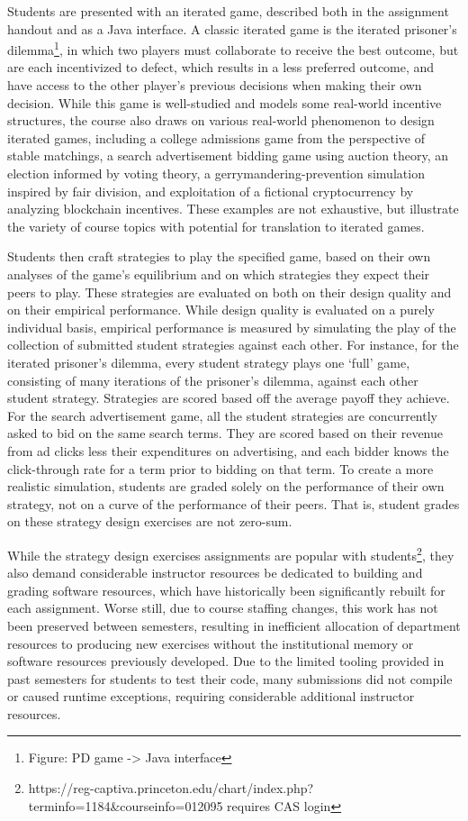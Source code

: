 \documentclass[pageno]{jpaper}
\begin{document}
Students are presented with an iterated game, described both in the assignment handout and as a Java interface.
A classic iterated game is the iterated prisoner's dilemma\footnote{Figure: PD game -> Java interface}, in which two players must collaborate to receive the best outcome, but are each incentivized to defect, which results in a less preferred outcome, and have access to the other player's previous decisions when making their own decision.
While this game is well-studied and models some real-world incentive structures, the course also draws on various real-world phenomenon to design iterated games, including a college admissions game from the perspective of stable matchings, a search advertisement bidding game using auction theory, an election informed by voting theory, a gerrymandering-prevention simulation inspired by fair division, and exploitation of a fictional cryptocurrency by analyzing blockchain incentives.
These examples are not exhaustive, but illustrate the variety of course topics with potential for translation to iterated games.

Students then craft strategies to play the specified game, based on their own analyses of the game's equilibrium and on which strategies they expect their peers to play.
These strategies are evaluated on both on their design quality and on their empirical performance.
While design quality is evaluated on a purely individual basis, empirical performance is measured by simulating the play of the collection of submitted student strategies against each other.
For instance, for the iterated prisoner's dilemma, every student strategy plays one `full' game, consisting of many iterations of the prisoner's dilemma, against each other student strategy.
Strategies are scored based off the average payoff they achieve.
For the search advertisement game, all the student strategies are concurrently asked to bid on the same search terms.
They are scored based on their revenue from ad clicks less their expenditures on advertising, and each bidder knows the click-through rate for a term prior to bidding on that term.
To create a more realistic simulation, students are graded solely on the performance of their own strategy, not on a curve of the performance of their peers.
That is, student grades on these strategy design exercises are not zero-sum.

While the strategy design exercises assignments are popular with students\footnote{https://reg-captiva.princeton.edu/chart/index.php?terminfo=1184\&courseinfo=012095 requires CAS login}, they also demand considerable instructor resources be dedicated to building and grading software resources, which have historically been significantly rebuilt for each assignment.
Worse still, due to course staffing changes, this work has not been preserved between semesters, resulting in inefficient allocation of department resources to producing new exercises without the institutional memory or software resources previously developed.
Due to the limited tooling provided in past semesters for students to test their code, many submissions did not compile or caused runtime exceptions, requiring considerable additional instructor resources.
\end{document}
